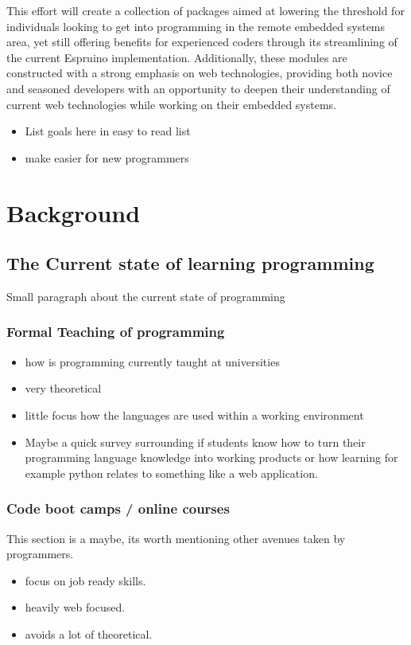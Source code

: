 \documentclass{l4proj}
\begin{document}
\text This effort will create a collection of packages aimed at lowering the threshold for individuals looking to get into programming in the remote embedded systems area, yet still offering benefits for experienced coders through its streamlining of the current Espruino implementation. Additionally, these modules are constructed with a strong emphasis on web technologies, providing both novice and seasoned developers with an opportunity to deepen their understanding of current web technologies while working on their embedded systems.
\begin{itemize}
    \item List goals here in easy to read list
    \item make easier for new programmers
\end{itemize}



\chapter{Background}

\section{The Current state of learning programming}
Small paragraph about the current state of programming
\subsection{Formal Teaching of programming}
\begin{itemize}
    \item how is programming currently taught at universities
    \item very theoretical
    \item little focus how the languages are used within a working environment
    \item Maybe a quick survey surrounding if students know how to turn their programming language knowledge into working products or how learning for example python relates to something like a web application.
\end{itemize}

\subsection{Code boot camps / online courses}
This section is a maybe, its worth mentioning other avenues taken by programmers.
\begin{itemize}
    \item focus on job ready skills.
    \item heavily web focused.
    \item avoids a lot of theoretical.
\end{itemize}
\end{document}
